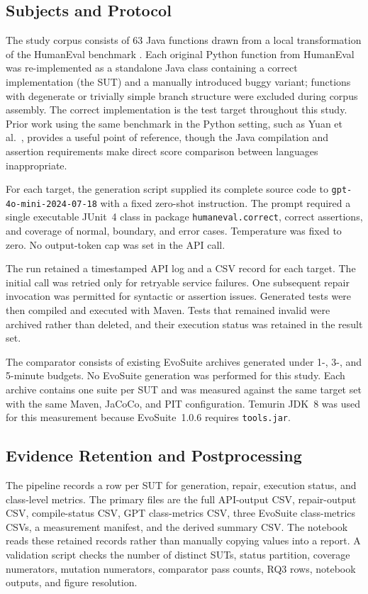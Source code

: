 ﻿\documentclass[conference]{IEEEtran}
\begin{document}
\subsection{Subjects and Protocol}
The study corpus consists of 63 Java functions drawn from a local transformation of the HumanEval benchmark \cite{chen2021codex}. Each original Python function from HumanEval was re-implemented as a standalone Java class containing a correct implementation (the SUT) and a manually introduced buggy variant; functions with degenerate or trivially simple branch structure were excluded during corpus assembly. The correct implementation is the test target throughout this study. Prior work using the same benchmark in the Python setting, such as Yuan et al.\ \cite{yuan2024junit}, provides a useful point of reference, though the Java compilation and assertion requirements make direct score comparison between languages inappropriate.

For each target, the generation script supplied its complete source code to \texttt{gpt-4o-mini-2024-07-18} with a fixed zero-shot instruction. The prompt required a single executable JUnit~4 class in package \texttt{humaneval.correct}, correct assertions, and coverage of normal, boundary, and error cases. Temperature was fixed to zero. No output-token cap was set in the API call.

The run retained a timestamped API log and a CSV record for each target. The initial call was retried only for retryable service failures. One subsequent repair invocation was permitted for syntactic or assertion issues. Generated tests were then compiled and executed with Maven. Tests that remained invalid were archived rather than deleted, and their execution status was retained in the result set.

The comparator consists of existing EvoSuite archives generated under 1-, 3-, and 5-minute budgets. No EvoSuite generation was performed for this study. Each archive contains one suite per SUT and was measured against the same target set with the same Maven, JaCoCo, and PIT configuration. Temurin JDK~8 was used for this measurement because EvoSuite~1.0.6 requires \texttt{tools.jar}.

\subsection{Evidence Retention and Postprocessing}
The pipeline records a row per SUT for generation, repair, execution status, and class-level metrics. The primary files are the full API-output CSV, repair-output CSV, compile-status CSV, GPT class-metrics CSV, three EvoSuite class-metrics CSVs, a measurement manifest, and the derived summary CSV. The notebook reads these retained records rather than manually copying values into a report. A validation script checks the number of distinct SUTs, status partition, coverage numerators, mutation numerators, comparator pass counts, RQ3 rows, notebook outputs, and figure resolution.
\end{document}
